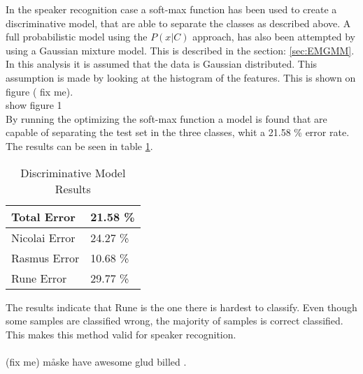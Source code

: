 In the speaker recognition case a soft-max function has been used to create a discriminative model, that are able to separate the classes as described above. A full probabilistic model using the $P(x|C)$ approach, has also been attempted by using a Gaussian mixture model. This is described in the section: \ref{sec:EMGMM}. In this analysis it is assumed that the data is Gaussian distributed. This assumption is made by looking at the histogram of the features. This is shown on figure ( fix me).\\

show figure 1\\

By running the optimizing the soft-max function a model is found that are capable of separating the test set in the three classes, whit a 21.58 \% error rate. The results can be seen in table \ref{tab:resultTableProp}. 

\begin{table}[h]
\centering
\begin{tabular}{ll}
\hline
Total Error   & 21.58 \% \\ \hline
Nicolai Error & 24.27 \% \\
Rasmus Error  & 10.68 \% \\
Rune Error    & 29.77 \% \\ \hline
\end{tabular}
\caption{Discriminative Model Results}
\label{tab:resultTableProp}
\end{table}

The results indicate that Rune is the one there is hardest to classify. Even though some samples are classified wrong, the majority of samples is correct classified. This makes this method valid for speaker recognition. \\
\ \\

(fix me) måske have awesome glud billed .

